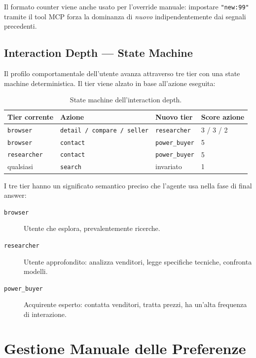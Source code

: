 Il formato counter viene anche usato per l'override manuale: impostare
\texttt{"new:99"} tramite il tool MCP forza la dominanza di
\emph{nuovo} indipendentemente dai segnali precedenti.

\subsection{Interaction Depth — State Machine}
\label{subsec:interaction-depth}

Il profilo comportamentale dell'utente avanza attraverso tre tier con
una state machine deterministica. Il tier viene alzato in base
all'azione eseguita:

\begin{table}[htbp]
\centering
\begin{tabular}{llll}
\hline
\textbf{Tier corrente} & \textbf{Azione} & \textbf{Nuovo tier}
    & \textbf{Score azione} \\
\hline
\texttt{browser}    & \texttt{detail / compare / seller} & \texttt{researcher}   & 3 / 3 / 2 \\
\texttt{browser}    & \texttt{contact}                   & \texttt{power\_buyer} & 5 \\
\texttt{researcher} & \texttt{contact}                   & \texttt{power\_buyer} & 5 \\
qualsiasi           & \texttt{search}                    & invariato             & 1 \\
\hline
\end{tabular}
\caption{State machine dell'interaction depth.}
\label{tab:interaction-depth}
\end{table}

I tre tier hanno un significato semantico preciso che l'agente usa
nella fase di final answer:

\begin{description}
    \item[\texttt{browser}] Utente che esplora, prevalentemente ricerche.
    \item[\texttt{researcher}] Utente approfondito: analizza venditori,
        legge specifiche tecniche, confronta modelli.
    \item[\texttt{power\_buyer}] Acquirente esperto: contatta venditori,
        tratta prezzi, ha un'alta frequenza di interazione.
\end{description}


\section{Gestione Manuale delle Preferenze}
\label{sec:manual-prefs}

